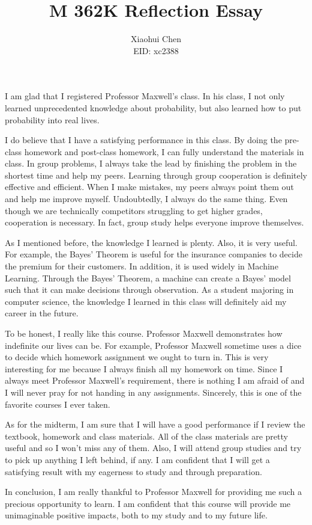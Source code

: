 \documentclass[12pt]{article}
\author{Xiaohui Chen \\EID: xc2388}
\title{M 362K Reflection Essay}
\begin{document}
\maketitle

I am glad that I registered Professor Maxwell's class. In his class, I not only learned unprecedented knowledge about probability, but also learned how to put probability into real lives.

I do believe that I have a satisfying performance in this class. By doing the pre-class homework and post-class homework, I can fully understand the materials in class. In group problems, I always take the lead by finishing the problem in the shortest time and help my peers. Learning through group cooperation is definitely effective and efficient. When I make mistakes, my peers always point them out and help me improve myself. Undoubtedly, I always do the same thing. Even though we are technically competitors struggling to get higher grades, cooperation is necessary. In fact, group study helps everyone improve themselves.

As I mentioned before, the knowledge I learned is plenty. Also, it is very useful. For example, the Bayes' Theorem is useful for the insurance companies to decide the premium for their customers. In addition, it is used widely in Machine Learning. Through the Bayes' Theorem, a machine can create a Bayes' model such that it can make decisions through observation. As a student majoring in computer science, the knowledge I learned in this class will definitely aid my career in the future.

To be honest, I really like this course. Professor Maxwell demonstrates how indefinite our lives can be. For example, Professor Maxwell sometime uses a dice to decide which homework assignment we ought to turn in. This is very interesting for me because I always finish all my homework on time. Since I always meet Professor Maxwell's requirement, there is nothing I am afraid of and I will never pray for not handing in any assignments. Sincerely, this is one of the favorite courses I ever taken.

As for the midterm, I am sure that I will have a good performance if I review the textbook, homework and class materials. All of the class materials are pretty useful and so I won't miss any of them. Also, I will attend group studies and try to pick up anything I left behind, if any. I am confident that I will get a satisfying result with my eagerness to study and through preparation.

In conclusion, I am really thankful to Professor Maxwell for providing me such a precious opportunity to learn. I am confident that this course will provide me unimaginable positive impacts, both to my study and to my future life.
\end{document}
